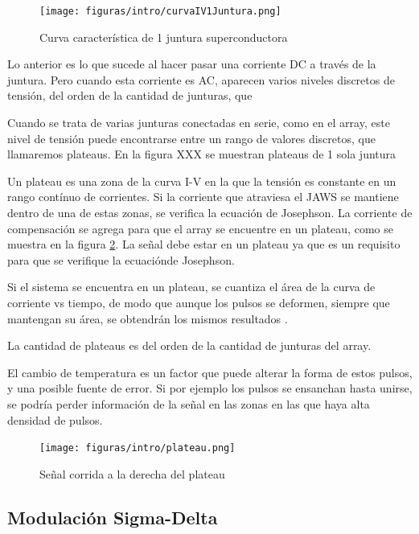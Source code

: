 \documentclass[twoside]{article}
\begin{document}
\begin{multicols}{2}
\begin{figure}[H]
    \centering
    \texttt{[image: figuras/intro/curvaIV1Juntura.png]}
    \caption{Curva característica de 1 juntura superconductora}
    \label{fig:intro_curvaIV1Juntura}
\end{figure}

Lo anterior es lo que sucede al hacer pasar una corriente DC a través de la juntura. Pero cuando esta corriente es AC, aparecen varios niveles discretos de tensión, del orden de la cantidad de junturas, que 

Cuando se trata de varias junturas conectadas en serie, como en el array, este nivel de tensión puede encontrarse entre un rango de valores discretos, que llamaremos plateaus. En la figura XXX se muestran plateaus de 1 sola juntura



Un plateau es una zona de la curva I-V en la que la tensión es constante en un rango contínuo de corrientes. Si la corriente que atraviesa el JAWS se mantiene dentro de una de estas zonas, se verifica la ecuación de Josephson.
La corriente de compensación se agrega para que el array se encuentre en un plateau, como se muestra en la figura \ref{fig:intro_plateau}. La señal debe estar en un plateau ya que es un requisito para que se verifique la ecuaciónde Josephson.

Si el sistema se encuentra en un plateau, se cuantiza el área de la curva de corriente vs tiempo, de modo que aunque los pulsos se deformen, siempre que mantengan su área, se obtendrán los mismos resultados \cite{benz1998}. 

La cantidad de plateaus es del orden de la cantidad de junturas del array. %

El cambio de temperatura es un factor que puede alterar la forma de estos pulsos, y una posible fuente de error. Si por ejemplo los pulsos se ensanchan hasta unirse, se podría perder información de la señal en las zonas en las que haya alta densidad de pulsos.



\begin{figure}[H]
    \centering
    \texttt{[image: figuras/intro/plateau.png]}
    \caption{Señal corrida a la derecha del plateau}
    \label{fig:intro_plateau}
\end{figure}

\subsection{Modulación Sigma-Delta}


\end{multicols}
\end{document}
